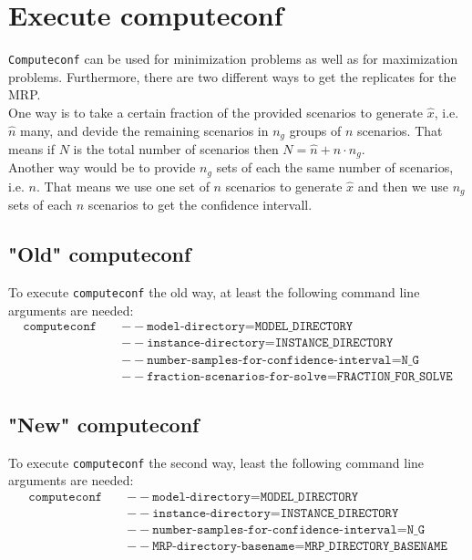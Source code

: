 \documentclass[a4paper]{article}
\begin{document}
\section{Execute computeconf}
\texttt{Computeconf} can be used for minimization problems as well as for maximization problems. Furthermore, there are two different ways to get the replicates for the MRP. \\
One way is to take a certain fraction of the provided scenarios to generate $\hat{x}$, i.e. $\hat{n}$ many, and devide the remaining scenarios in $n_g$ groups of $n$ scenarios. That means if $N$ is the total number of scenarios then $N = \hat{n} + n \cdot n_g$. \\
Another way would be to provide $n_g$ sets of each the same number of scenarios, i.e. $n$. That means we use one set of $n$ scenarios to generate $\hat{x}$ and then we use $n_g$ sets of each $n$ scenarios to get the confidence intervall.

\subsection{"Old" computeconf} \label{old}
To execute \texttt{computeconf} the old way, at least the following command line arguments are needed:
\begin{eqnarray*}
	\texttt{computeconf } && \texttt{$--$model-directory=MODEL\_DIRECTORY } \\ && \texttt{$--$instance-directory=INSTANCE\_DIRECTORY } \\ && \texttt{$--$number-samples-for-confidence-interval=N\_G } \\ && \texttt{$--$fraction-scenarios-for-solve=FRACTION\_FOR\_SOLVE}
\end{eqnarray*}


\subsection{"New" computeconf} \label{new}
To execute \texttt{computeconf} the second way, least the following command line arguments are needed:
\begin{eqnarray*}
	\texttt{computeconf } && \texttt{$--$model-directory=MODEL\_DIRECTORY } \\ && \texttt{$--$instance-directory=INSTANCE\_DIRECTORY } \\ && \texttt{$--$number-samples-for-confidence-interval=N\_G } \\ && \texttt{$--$MRP-directory-basename=MRP\_DIRECTORY\_BASENAME}
\end{eqnarray*}
\end{document}
